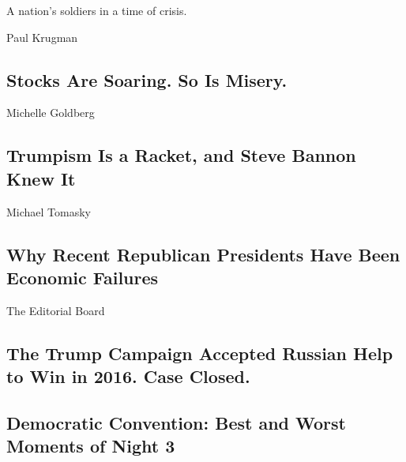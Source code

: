 A nation's soldiers in a time of crisis.

\href{/2020/08/20/opinion/democratic-convention-warren-biden-obama.html}{}

\href{/2020/08/20/opinion/stock-market-unemployment.html}{}

Paul Krugman

\hypertarget{stocks-are-soaring-so-is-misery}{%
\subsection{Stocks Are Soaring. So Is
Misery.}\label{stocks-are-soaring-so-is-misery}}

\href{/2020/08/20/opinion/trump-steve-bannon-fraud.html}{}

Michelle Goldberg

\hypertarget{trumpism-is-a-racket-and-steve-bannon-knew-it}{%
\subsection{Trumpism Is a Racket, and Steve Bannon Knew
It}\label{trumpism-is-a-racket-and-steve-bannon-knew-it}}

\href{/2020/08/20/opinion/democrats-republicans-economy.html}{}

Michael Tomasky

\hypertarget{why-recent-republican-presidents-have-been-economic-failures}{%
\subsection{Why Recent Republican Presidents Have Been Economic
Failures}\label{why-recent-republican-presidents-have-been-economic-failures}}

\href{/2020/08/19/opinion/trump-russia-2016-report.html}{}

The Editorial Board

\hypertarget{the-trump-campaign-accepted-russian-help-to-win-in-2016-case-closed}{%
\subsection{The Trump Campaign Accepted Russian Help to Win in 2016.
Case
Closed.}\label{the-trump-campaign-accepted-russian-help-to-win-in-2016-case-closed}}

\href{/interactive/2020/08/20/opinion/democratic-convention-best-worst-night-3.html}{}

\hypertarget{democratic-convention-best-and-worst-moments-of-night-3}{%
\subsection{Democratic Convention: Best and Worst Moments of Night
3}\label{democratic-convention-best-and-worst-moments-of-night-3}}

